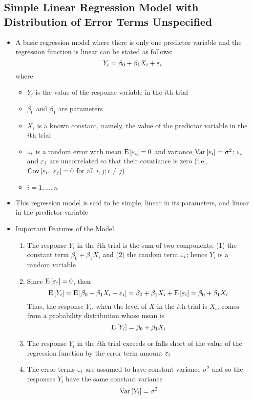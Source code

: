 \subsection{Simple Linear Regression Model with Distribution of Error Terms Unspecified}
\begin{itemize}
\item A basic regression model where there is only one predictor variable and the regression function is linear can be stated as follows: $$ Y_i = \beta_0 + \beta_1X_i + \varepsilon_i$$ where 
\begin{itemize}[label={}]
\item $Y_i$ is the value of the response variable in the $i$th trial
\item $\beta_0$ and $\beta_1$ are parameters 
\item $X_i$ is a known constant, namely, the value of the predictor variable in the $i$th trial
\item $\varepsilon_i$ is a random error with mean $\mathrm{E}\left[ \varepsilon_i \right] = 0$ and variance $\mathrm{Var}\left[ \varepsilon_i \right] = \sigma^2$; $\varepsilon_i$ and $\varepsilon_j$ are uncorrelated so that their covariance is zero (i.e., $\mathrm{Cov}\left[ \varepsilon_i,~\varepsilon_j\right] = 0$ for all $i,j; i \neq j$) 
\item $i = 1, \dots, n$ \end{itemize} 
\item This regression model is said to be simple, linear in its parameters, and linear in the predictor variable \newpage
\item Important Features of the Model \begin{enumerate}
\item The response $Y_i$ in the $i$th trial is the sum of two components: (1) the constant term $\beta_0 + \beta_1X_i$ and (2) the random term $\varepsilon_i$; hence $Y_i$ is a random variable 
\item Since $\mathrm{E}\left[ \varepsilon_i \right] = 0$, then
$$ \mathrm{E}\left[ Y_i \right] = \mathrm{E}\left[ \beta_0 + \beta_1X_i + \varepsilon_i \right] = \beta_0 + \beta_1X_i + \mathrm{E}\left[ \varepsilon_i \right] = \beta_0 + \beta_1X_i $$ 
Thus, the response $Y_i$, when the level of $X$ in the $i$th trial is $X_i$, comes from a probability distribution whose mean is $$ \mathrm{E}\left[ Y_i \right] = \beta_0 + \beta_1X_i$$ 
\item The response $Y_i$ in the $i$th trial exceeds or falls short of the value of the regression function by the error term amount $\varepsilon_i$
\item The error terms $\varepsilon_i$ are assumed to have constant variance $\sigma^2$ and so the responses $Y_i$ have the same constant variance $$ \mathrm{Var}\left[ Y_i \right] = \sigma^2 $$ 

\end{enumerate}
\end{itemize}
